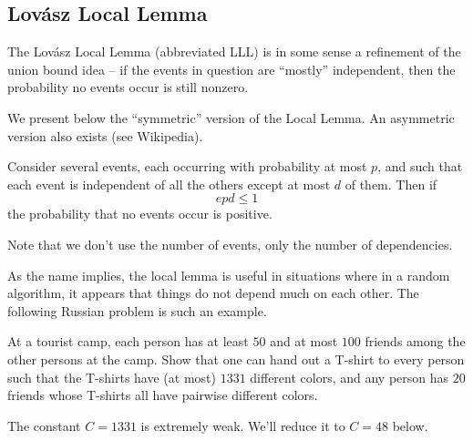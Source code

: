 \documentclass[11pt]{scrartcl}
\begin{document}
\subsection{Lov\'asz Local Lemma}
The Lov\'asz Local Lemma (abbreviated LLL)
is in some sense a refinement of the union bound idea -- if the events in question
are ``mostly'' independent, then the probability no events occur is still nonzero.

We present below the ``symmetric'' version of the Local Lemma.
An asymmetric version also exists (see Wikipedia).
\begin{theorem}
	Consider several events, each occurring with probability at most $p$,
	and such that each event is independent of all the others except at most $d$ of them.
	Then if \[ epd \le 1 \] the probability that no events occur is positive.
\end{theorem}
Note that we don't use the number of events, only the number of dependencies.

As the name implies, the local lemma is useful in situations where in a random algorithm,
it appears that things do not depend much on each other.
The following Russian problem is such an example.

\begin{example}
	[Russia 2006] At a tourist camp, each person has at least $50$ and at most $100$ friends among the other persons at the camp.
	Show that one can hand out a T-shirt to every person such that the T-shirts have (at most) $1331$ different colors,
	and any person has $20$ friends whose T-shirts all have pairwise different colors.
\end{example}

The constant $C = 1331$ is extremely weak. We'll reduce it to $C = 48$ below.
\end{document}
